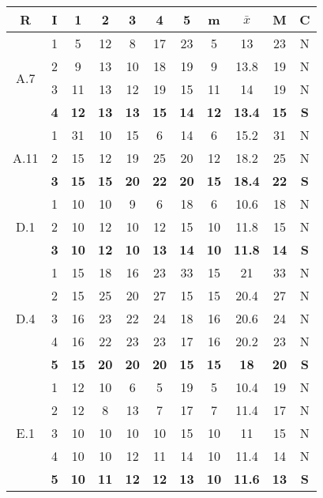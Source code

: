 \documentclass[11pt,a4paper,spanish,twoside]{book}
\begin{document}
\begin{table}[!h]
  \centering
  \begin{tabular}{|c|c||c|c|c|c|c||c|c|c||c|}
    \hline
    \textbf{R} & \textbf{I} & \textbf{1} & \textbf{2} & 
    \textbf{3} & \textbf{4} & \textbf{5} & \textbf{m} &
    \textbf{$\bar{x}$} & \textbf{M} & \textbf{C} \\

    \hline \multirow{4}{*}{A.7} 
    & 1 & 5  & 12 & 8  & 17 & 23 & 5  & 13   & 23 & N \\
    & 2 & 9  & 13 & 10 & 18 & 19 & 9  & 13.8 & 19 & N \\
    & 3 & 11 & 13 & 12 & 19 & 15 & 11 & 14   & 19 & N \\
    & \textbf{4} & \textbf{12} & \textbf{13} & \textbf{13} & \textbf{15} &
    \textbf{14} & \textbf{12} & \textbf{13.4} & \textbf{15} & \textbf{S} \\ 

    \hline \multirow{3}{*}{A.11} 
    & 1 & 31 & 10 & 15 & 6  & 14 & 6  & 15.2 & 31 & N \\
    & 2 & 15 & 12 & 19 & 25 & 20 & 12 & 18.2 & 25 & N \\
    & \textbf{3} & \textbf{15} & \textbf{15} & \textbf{20} & \textbf{22} &
    \textbf{20} & \textbf{15} & \textbf{18.4} & \textbf{22} & \textbf{S} \\ 
    
    \hline \multirow{3}{*}{D.1} 
    & 1 & 10 & 10 & 9  & 6  & 18 & 6  & 10.6 & 18 & N \\
    & 2 & 10 & 12 & 10 & 12 & 15 & 10 & 11.8 & 15 & N \\
    & \textbf{3} & \textbf{10} & \textbf{12} & \textbf{10} & \textbf{13} &
    \textbf{14} & \textbf{10} & \textbf{11.8} & \textbf{14} & \textbf{S} \\ 
    
    \hline \multirow{5}{*}{D.4} 
    & 1 & 15 & 18 & 16 & 23 & 33 & 15 & 21   & 33 & N \\
    & 2 & 15 & 25 & 20 & 27 & 15 & 15 & 20.4 & 27 & N \\
    & 3 & 16 & 23 & 22 & 24 & 18 & 16 & 20.6 & 24 & N \\
    & 4 & 16 & 22 & 23 & 23 & 17 & 16 & 20.2 & 23 & N \\
    & \textbf{5} & \textbf{15} & \textbf{20} & \textbf{20} & \textbf{20} &
    \textbf{15} & \textbf{15} & \textbf{18} & \textbf{20} & \textbf{S} \\
    
    \hline \multirow{5}{*}{E.1} 
    & 1 & 12 & 10 & 6  & 5  & 19 & 5  & 10.4 & 19 & N \\
    & 2 & 12 & 8  & 13 & 7  & 17 & 7  & 11.4 & 17 & N \\
    & 3 & 10 & 10 & 10 & 10 & 15 & 10 & 11   & 15 & N \\
    & 4 & 10 & 10 & 12 & 11 & 14 & 10 & 11.4 & 14 & N \\
    & \textbf{5} & \textbf{10} & \textbf{11} & \textbf{12} & \textbf{12} &
    \textbf{13} & \textbf{10} & \textbf{11.6} & \textbf{13} & \textbf{S} \\ 
    

\end{tabular}
\end{table}
\end{document}

